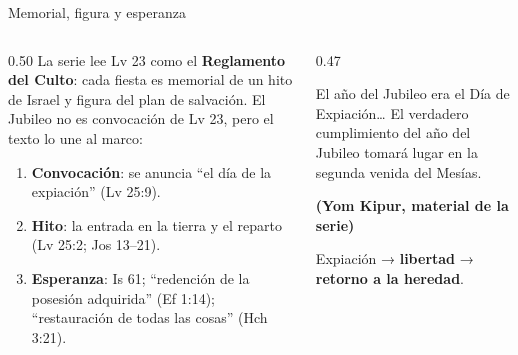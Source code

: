 \documentclass[hyperref={bookmarks=false},aspectratio=169]{beamer}
\newcommand{\fuente}[1]{\par\hfill{\upshape\bfseries\footnotesize\textcolor{tierraroja}{#1}}}
\newcommand{\destacar}[1]{\textbf{\textcolor{tierraroja}{#1}}}
\begin{document}
\begin{frame}{Memorial, figura y esperanza}
\begin{columns}[c,onlytextwidth]
\begin{column}{0.50\textwidth}\scriptsize\RaggedRight
La serie lee Lv 23 como el \destacar{Reglamento del Culto}: cada fiesta es memorial de un hito de Israel y figura del plan de salvación. El Jubileo no es convocación de Lv 23, pero el texto lo une al marco:
\begin{enumerate}
\item \textbf{Convocación}: se anuncia ``el día de la expiación'' (Lv 25:9).
\item \textbf{Hito}: la entrada en la tierra y el reparto (Lv 25:2; Jos 13--21).
\item \textbf{Esperanza}: Is 61; ``redención de la posesión adquirida'' (Ef 1:14); ``restauración de todas las cosas'' (Hch 3:21).
\end{enumerate}
\end{column}
\begin{column}{0.47\textwidth}
\begin{cita}El año del Jubileo era el Día de Expiación\ldots{} El verdadero cumplimiento del año del Jubileo tomará lugar en la segunda venida del Mesías.\fuente{(Yom Kipur, material de la serie)}\end{cita}
\scriptsize Expiación → \destacar{libertad} → \destacar{retorno a la heredad}.
\end{column}
\end{columns}
\end{frame}
\end{document}
